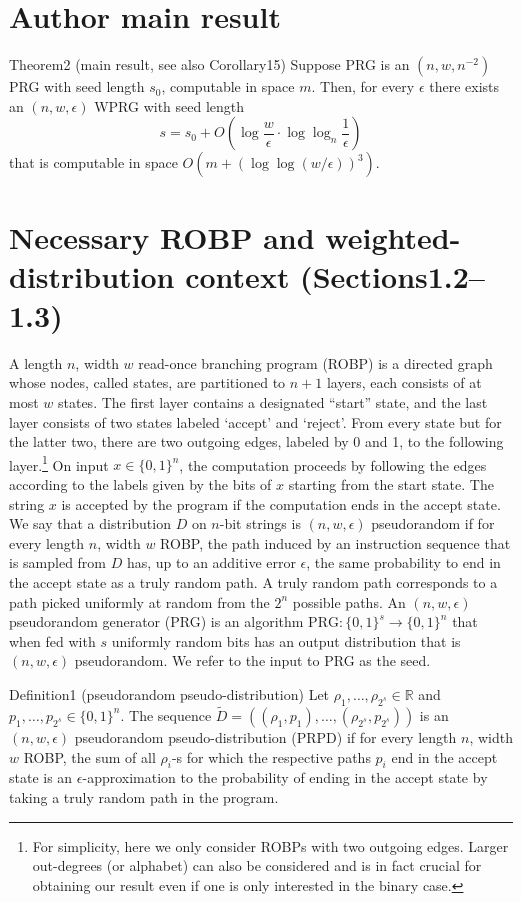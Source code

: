 \section*{Author main result}
\begin{authorclaim}{Theorem2 (main result, see also Corollary15)}
Suppose PRG is an $(n,w,n^{-2})$ PRG with seed length $s_0$, computable in space $m$. Then, for every $\epsilon$ there exists an $(n,w,\epsilon)$ WPRG with seed length
\[s=s_0+O\left(\log\frac w\epsilon\cdot\log\log_n\frac1\epsilon\right)\]
that is computable in space $O(m+(\log\log(w/\epsilon))^3)$.
\end{authorclaim}
\section*{Necessary ROBP and weighted-distribution context (Sections1.2--1.3)}
A length $n$, width $w$ read-once branching program (ROBP) is a directed graph whose nodes, called states, are partitioned to $n+1$ layers, each consists of at most $w$ states. The first layer contains a designated ``start'' state, and the last layer consists of two states labeled `accept' and `reject'. From every state but for the latter two, there are two outgoing edges, labeled by 0 and 1, to the following layer.\footnote{For simplicity, here we only consider ROBPs with two outgoing edges. Larger out-degrees (or alphabet) can also be considered and is in fact crucial for obtaining our result even if one is only interested in the binary case.} On input $x\in\{0,1\}^n$, the computation proceeds by following the edges according to the labels given by the bits of $x$ starting from the start state. The string $x$ is accepted by the program if the computation ends in the accept state.
We say that a distribution $D$ on $n$-bit strings is $(n,w,\epsilon)$ pseudorandom if for every length $n$, width $w$ ROBP, the path induced by an instruction sequence that is sampled from $D$ has, up to an additive error $\epsilon$, the same probability to end in the accept state as a truly random path. A truly random path corresponds to a path picked uniformly at random from the $2^n$ possible paths. An $(n,w,\epsilon)$ pseudorandom generator (PRG) is an algorithm $\mathrm{PRG}:\{0,1\}^s\to\{0,1\}^n$ that when fed with $s$ uniformly random bits has an output distribution that is $(n,w,\epsilon)$ pseudorandom. We refer to the input to PRG as the seed.
\begin{authorclaim}{Definition1 (pseudorandom pseudo-distribution)}
Let $\rho_1,\ldots,\rho_{2^s}\in\mathbb R$ and $p_1,\ldots,p_{2^s}\in\{0,1\}^n$. The sequence $\widetilde D=((\rho_1,p_1),\ldots,(\rho_{2^s},p_{2^s}))$ is an $(n,w,\epsilon)$ pseudorandom pseudo-distribution (PRPD) if for every length $n$, width $w$ ROBP, the sum of all $\rho_i$-s for which the respective paths $p_i$ end in the accept state is an $\epsilon$-approximation to the probability of ending in the accept state by taking a truly random path in the program.
\end{authorclaim}
